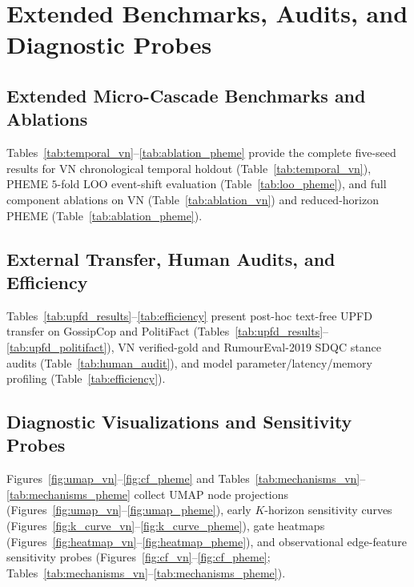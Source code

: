 \documentclass[conference]{IEEEtran}
\begin{document}



\clearpage
\appendices
\section{Extended Benchmarks, Audits, and Diagnostic Probes}\label{app:extended}
\subsection{Extended Micro-Cascade Benchmarks and Ablations}\label{app:micro_ext}
Tables~\ref{tab:temporal_vn}--\ref{tab:ablation_pheme} provide the complete five-seed results for VN chronological temporal holdout (Table~\ref{tab:temporal_vn}), PHEME $5$-fold LOO event-shift evaluation (Table~\ref{tab:loo_pheme}), and full component ablations on VN (Table~\ref{tab:ablation_vn}) and reduced-horizon PHEME (Table~\ref{tab:ablation_pheme}).

\subsection{External Transfer, Human Audits, and Efficiency}\label{app:transfer_audit}
Tables~\ref{tab:upfd_results}--\ref{tab:efficiency} present post-hoc text-free UPFD transfer on GossipCop and PolitiFact (Tables~\ref{tab:upfd_results}--\ref{tab:upfd_politifact}), VN verified-gold and RumourEval-2019 SDQC stance audits (Table~\ref{tab:human_audit}), and model parameter/latency/memory profiling (Table~\ref{tab:efficiency}).

\subsection{Diagnostic Visualizations and Sensitivity Probes}\label{app:diagnostics}
Figures~\ref{fig:umap_vn}--\ref{fig:cf_pheme} and Tables~\ref{tab:mechanisms_vn}--\ref{tab:mechanisms_pheme} collect UMAP node projections (Figures~\ref{fig:umap_vn}--\ref{fig:umap_pheme}), early $K$-horizon sensitivity curves (Figures~\ref{fig:k_curve_vn}--\ref{fig:k_curve_pheme}), gate heatmaps (Figures~\ref{fig:heatmap_vn}--\ref{fig:heatmap_pheme}), and observational edge-feature sensitivity probes (Figures~\ref{fig:cf_vn}--\ref{fig:cf_pheme}; Tables~\ref{tab:mechanisms_vn}--\ref{tab:mechanisms_pheme}).

\end{document}

